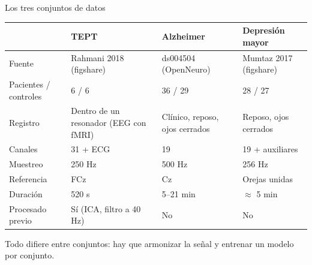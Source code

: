 \documentclass[aspectratio=169,11pt]{beamer}
\begin{document}
\begin{frame}{Los tres conjuntos de datos}
  \footnotesize
  \centering
  \begin{tabular}{@{}P{2.6cm} P{3.3cm} P{3.3cm} P{3.3cm}@{}}
    \toprule
     & \textbf{TEPT} & \textbf{Alzheimer} & \textbf{Depresión mayor} \\
    \midrule
    Fuente & Rahmani 2018 (figshare) & ds004504 (OpenNeuro) & Mumtaz 2017 (figshare) \\
    Pacientes / controles & 6 / 6 & 36 / 29 & 28 / 27 \\
    Registro & Dentro de un resonador (EEG con fMRI) & Clínico, reposo, ojos cerrados & Reposo, ojos cerrados \\
    Canales & 31 + ECG & 19 & 19 + auxiliares \\
    Muestreo & 250 Hz & 500 Hz & 256 Hz \\
    Referencia & FCz & Cz & Orejas unidas \\
    Duración & 520 s & 5--21 min & $\approx$ 5 min \\
    Procesado previo & Sí (ICA, filtro a 40 Hz) & No & No \\
    \bottomrule
  \end{tabular}

  \vspace{3mm}
  {\small Todo difiere entre conjuntos: hay que \alert{armonizar} la señal y entrenar \alert{un modelo por conjunto}.}
\end{frame}
\end{document}
